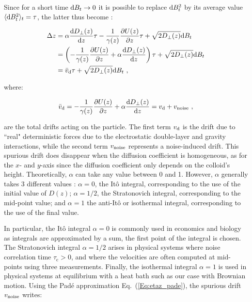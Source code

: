 Since for a short time $\textnormal{d}B_t \rightarrow 0$ it is possible to replace $\textnormal{d}B_t ^2$ by its average value  $\langle \textnormal{d}B_t ^2 \rangle _t = \tau$, the latter thus become \cite{ikeda_stochastic_2014}: 

\begin{equation}
	\begin{aligned}
		\Delta z &=   \alpha  \frac{\textnormal{d} D_\bot(z)}{\textnormal{d}z}  \tau - \frac{1}{\gamma(z)}\frac{\partial U(z)}{\partial z}  \tau + \sqrt{2D_\bot (z)} \textnormal{d}B_t \\
		&=  \left( - \frac{1}{\gamma(z)}\frac{\partial U(z)}{\partial z} +  \alpha  \frac{\textnormal{d} D_\bot(z)}{\textnormal{d}z} \right) \tau + \sqrt{2D_\bot (z)} \textnormal{d}B_t \\
		&= \bar{v}_\textnormal{d}\tau  + \sqrt{2D_\bot (z)} \textnormal{d}B_t ~,
	\end{aligned}
\end{equation}

where:

\begin{equation}
	\bar{v}_\textnormal{d} = - \frac{1}{\gamma(z)}\frac{\partial U(z)}{\partial z} +  \alpha  \frac{\textnormal{d} D_\bot(z)}{\textnormal{d}z}  = v_\textnormal{d} + v_\textnormal{noise}~,
	\label{Eq.total_drifts}
\end{equation}

are the total drifts acting on the particle. The first term $v_\textnormal{d}$ is the drift  due to ``real" deterministic forces due to the electrostatic double-layer and gravity interactions, while the second term $ v_\textnormal{noise}$ represents a noise-induced drift. This spurious drift does disappear when the diffusion coefficient is homogeneous, as for the $x$- and $y$-axis since the diffusion coefficient only depends on the colloid's height. Theoretically, $\alpha$ can take any value between 0 and 1. However, $\alpha$ generally takes 3 different values \cite{volpe_effective_2016}:  $\alpha = 0$, the Itô integral, corresponding to the use of the initial value of $D(z)$; $\alpha = 1/2$, the Stratonovich integral, corresponding to the mid-point value; and $\alpha = 1$ the anti-Itô or isothermal integral, corresponding to the use of the final value. 

In particular, the Itô integral $\alpha = 0$ is commonly used in economics and biology as integrals are approximated by a sum, the first point of the integral is chosen.  The Stratonovich integral $\alpha = 1/2$ arises in physical systems where noise correlation time $\tau _\mathrm{c} > 0$, and where the velocities are often computed at mid-points using three measurements. Finally, the isothermal integral $\alpha = 1$ is used in physical systems at equilibrium with a heat bath \cite{volpe_influence_2010} such as our case with Brownian motion. Using the Padé approximation Eq.~(\ref{Eq:etaz_pade}), the spurious drift $v_\textnormal{noise}$ writes:

